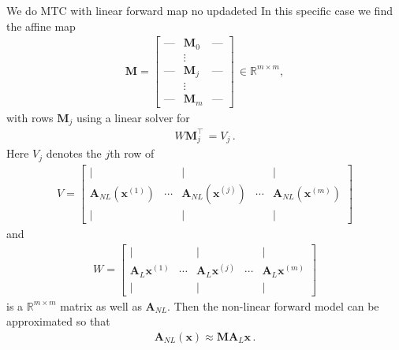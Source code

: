 We do MTC with linear forward map no updadeted
In this specific case we find the affine map
\begin{align}
	\bm{M} = \begin{bmatrix}
		\text{---} & \bm{M}_0 &   \text{---}  \\
		&  \vdots  & \\
		\text{---}& \bm{M}_j &  \text{---} \\
		&  \vdots  & \\
		\text{---} & \bm{M}_m &   \text{---}
	\end{bmatrix} \, \in \mathbb{R}^{m \times m} ,
\end{align}
with rows $\bm{M}_j$ using a linear solver for
\begin{align}
	W \bm{M}_j^\top \, = V_{j} \, .
\end{align}
Here $V_j$ denotes the $j$th row of  
\begin{align}
	V = \begin{bmatrix}
		\vert&   &  \vert & & \vert \\
		\bm{A}_{NL} (\bm{x}^{(1)} ) &  \cdots& \bm{A}_{NL} (\bm{x}^{(j)} )&  \cdots & \bm{A}_{NL} (\bm{x}^{(m)})  \\
		\vert&   &  \vert & & \vert 
	\end{bmatrix}
\end{align}
and
\begin{align}
	W = \begin{bmatrix}
		\vert&   &  \vert & & \vert \\
		\bm{A}_{L} \bm{x}^{(1)} &  \cdots& \bm{A}_{L} \bm{x}^{(j)} &  \cdots & \bm{A}_{L} \bm{x}^{(m)} \\
		\vert&   &  \vert & & \vert 
	\end{bmatrix}
\end{align}
is a $\mathbb{R}^{m \times m} $ matrix as well as $\bm{A}_{NL}$.
Then the non-linear forward model can be approximated so that
\begin{align}
	\bm{A}_{NL}(\bm{x}) \approx \bm{M A}_L \bm{x}\, .
\end{align}

